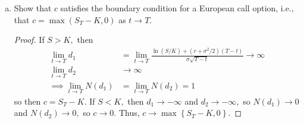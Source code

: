 \documentclass{article}
\begin{document}
\begin{itemize}
\begin{enumerate}[(a)]
			\item Show that $c$ satisfies the boundary condition for a European call option, i.e., that $c=\max(S_T-K, 0)$ as $t\to T.$
				\begin{proof}
					If $S>K,$ then 
					\begin{align*}
						\lim_{t\to T} d_1 &= \lim_{t\to T}\frac{\ln(S/K) + (r+\sigma^2/2)(T-t)}{\sigma\sqrt{T-t}} \to\infty \\
						\lim_{t\to T} d_2 &\to \infty \\
						\implies \lim_{t\to T} N(d_1)&=\lim_{t\to T} N(d_2) = 1
					\end{align*}
					so then $c=S_T-K.$ If $S<K,$ then $d_1\to -\infty$ and $d_2\to -\infty,$ so $N(d_1)\to 0$ and $N(d_2)\to 0,$ so $c\to 0.$ Thus, $c\to \max\left\{ S_T-K, 0 \right\}.$
				\end{proof}

		\end{enumerate}


\end{itemize}
\end{document}
